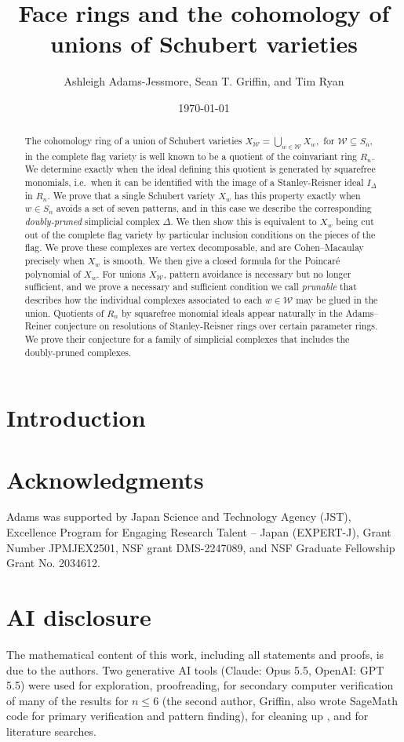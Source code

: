 \documentclass[11pt]{article}
\title{Face rings and the cohomology of unions of Schubert varieties}
\author{Ashleigh Adams-Jessmore, Sean T. Griffin, and Tim Ryan}
\date{\today}
\theoremstyle{definition}
\theoremstyle{plain}
\newcommand{\sn}{S_n}
\newcommand{\calW}{\mathcal{W}}
\begin{document}
\maketitle
\begin{abstract}
The cohomology ring of a union of Schubert varieties $X_{\calW}=\bigcup_{w\in\calW}X_w,$ for $\calW\subseteq\sn$, in the complete flag variety is well known to be a quotient of the coinvariant ring $R_n$. 
We determine exactly when the ideal defining this quotient is generated by squarefree monomials, i.e.~when it can be identified with the image of a Stanley-Reisner ideal $I_\Delta$ in $R_n$. 
We prove that a single Schubert variety $X_w$ has this property exactly when $w\in\sn$ avoids a set of seven patterns, and in this case we describe the corresponding \emph{doubly-pruned} simplicial complex $\Delta$. We then show this is equivalent to $X_w$ being cut out of the complete flag variety by particular inclusion conditions on the pieces of the flag. 
We prove these complexes are vertex decomposable, and are Cohen--Macaulay precisely when $X_w$ is smooth. We then give a closed formula for the Poincar{\'e} polynomial of $X_w$.
For unions $X_\calW$, pattern avoidance is necessary but no longer sufficient, and we prove a necessary and sufficient condition we call \emph{prunable} that describes how the individual complexes associated to each $w\in \calW$ may be glued in the union. 
Quotients of $R_n$ by squarefree monomial ideals appear naturally in the Adams--Reiner conjecture on resolutions of Stanley-Reisner rings over certain parameter rings. We prove their conjecture for a family of simplicial complexes that includes the doubly-pruned complexes.
\end{abstract}
\section{Introduction}
\label{sec: introduction}

\section*{Acknowledgments}
Adams was supported by Japan Science and Technology Agency (JST), Excellence Program for Engaging Research Talent – Japan (EXPERT-J), Grant Number JPMJEX2501, NSF grant DMS-2247089, and NSF Graduate Fellowship Grant No. 2034612.
\section*{AI disclosure}
The mathematical content of this work, including all statements and proofs, is due to the authors. Two generative AI tools (Claude: Opus 5.5, OpenAI: GPT 5.5) were used for exploration, proofreading, for secondary computer verification of many of the results for $n\leq 6$ (the second author, Griffin, also wrote SageMath code for primary verification and pattern finding), for cleaning up , and for literature searches.
\end{document}
